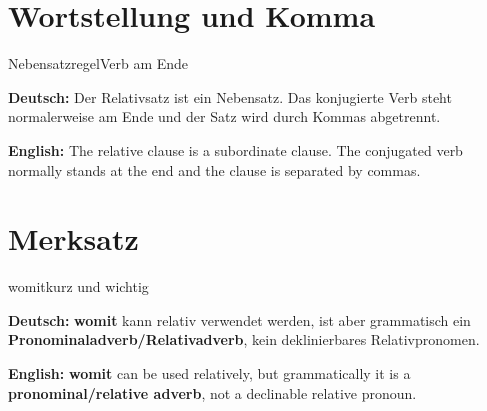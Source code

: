 \documentclass[a4paper,11pt]{article}
\newcommand{\GermanText}[1]{\textbf{Deutsch: }#1\par}
\newcommand{\EnglishText}[1]{{\small\color{SoftGray}\textbf{English: }#1\par}}
\begin{document}
\section{Wortstellung und Komma}

\begin{grammarentry}{Nebensatzregel}{Verb am Ende}

\GermanText{Der Relativsatz ist ein Nebensatz. Das konjugierte Verb steht normalerweise am Ende und der Satz wird durch Kommas abgetrennt.}

\EnglishText{The relative clause is a subordinate clause. The conjugated verb normally stands at the end and the clause is separated by commas.}

\end{grammarentry}

\section{Merksatz}

\begin{grammarentry}{womit}{kurz und wichtig}

\GermanText{\textbf{womit} kann relativ verwendet werden, ist aber grammatisch ein \textbf{Pronominaladverb/Relativadverb}, kein deklinierbares Relativpronomen.}

\EnglishText{\textbf{womit} can be used relatively, but grammatically it is a \textbf{pronominal/relative adverb}, not a declinable relative pronoun.}

\end{grammarentry}
\end{document}
